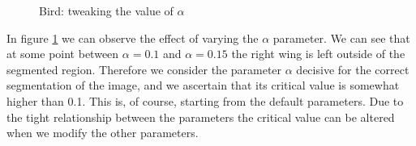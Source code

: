 \begin{figure}[!hbt]
\centering   
{}

\caption{Bird: tweaking the value of $ \alpha $}
\label{fig:ex2-alpha-tweak}
\end{figure}

In figure \ref{fig:ex2-alpha-tweak} we can observe the effect of varying the $\alpha$ parameter.
We can see that at some point between $\alpha=0.1$ and $\alpha=0.15$ the right wing is left
outside of the segmented region. Therefore we consider the parameter $\alpha$ decisive for
the correct segmentation of the image, and we ascertain that its critical value is somewhat
higher than 0.1. This is, of course, starting from the default parameters. Due to the tight
relationship between the parameters the critical value can be altered when we modify the other
parameters.

